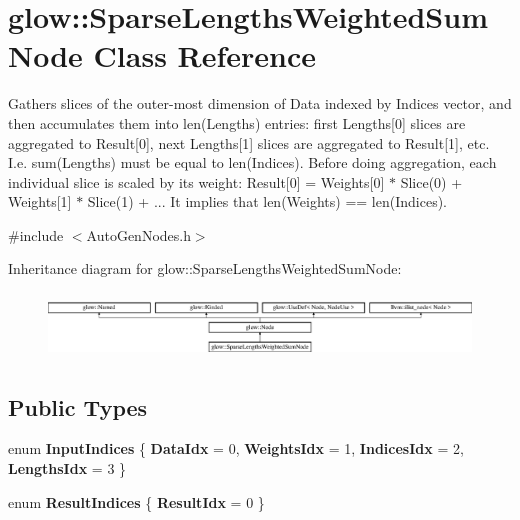 \hypertarget{classglow_1_1_sparse_lengths_weighted_sum_node}{}\section{glow\+:\+:Sparse\+Lengths\+Weighted\+Sum\+Node Class Reference}
\label{classglow_1_1_sparse_lengths_weighted_sum_node}


Gathers slices of the outer-\/most dimension of Data indexed by Indices vector, and then accumulates them into len(\+Lengths) entries\+: first Lengths\mbox{[}0\mbox{]} slices are aggregated to Result\mbox{[}0\mbox{]}, next Lengths\mbox{[}1\mbox{]} slices are aggregated to Result\mbox{[}1\mbox{]}, etc. I.\+e. sum(\+Lengths) must be equal to len(\+Indices). Before doing aggregation, each individual slice is scaled by its weight\+: Result\mbox{[}0\mbox{]} = Weights\mbox{[}0\mbox{]} $\ast$ Slice(0) + Weights\mbox{[}1\mbox{]} $\ast$ Slice(1) + ... It implies that len(\+Weights) == len(\+Indices).  




{\ttfamily \#include $<$Auto\+Gen\+Nodes.\+h$>$}

Inheritance diagram for glow\+:\+:Sparse\+Lengths\+Weighted\+Sum\+Node\+:\begin{figure}[H]
\begin{center}
\leavevmode
\includegraphics[height=1.735537cm]{classglow_1_1_sparse_lengths_weighted_sum_node}
\end{center}
\end{figure}
\subsection*{Public Types}
\begin{DoxyCompactItemize}
\item 
\mbox{\label{classglow_1_1_sparse_lengths_weighted_sum_node_a4447ffda22836e3332154a51f7f48751}} 
enum {\bfseries Input\+Indices} \{ {\bfseries Data\+Idx} = 0, 
{\bfseries Weights\+Idx} = 1, 
{\bfseries Indices\+Idx} = 2, 
{\bfseries Lengths\+Idx} = 3
 \}
\item 
\mbox{\label{classglow_1_1_sparse_lengths_weighted_sum_node_afde354ce9f35a6951eab64ff4f991895}} 
enum {\bfseries Result\+Indices} \{ {\bfseries Result\+Idx} = 0
 \}
\end{DoxyCompactItemize}

